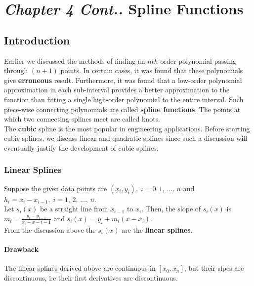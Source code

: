 \documentclass[aima203_lecturenotes_ku.tex]{subfiles}
\begin{document}
\chapter*{\textit{Chapter 4 Cont..} \hspace{15mm}  Spline Functions}
\section{Introduction}
Earlier we discussed the methods of finding an $nth$ order polynomial passing through $(n+1)$ points. In certain cases, it was found that these polynomials give \textbf{erroneous} result. Furthermore, it was found that a low-order polynomial approximation in each sub-interval provides a better approximation to the function than fitting a single high-order polynomial to the entire interval.
Such piece-wise connecting polynomials are called \textbf{spline functions}. The points at which two connecting splines meet are called knots.\\
The \textbf{cubic} spline is the most popular in engineering applications. Before starting cubic splines, we discuss linear and quadratic splines since such a discussion will eventually justify the development of cubic splines.

\subsection{Linear Splines}
Suppose the given data points are $(x_i,y_i), \; i=0,1,\, ..., \, n$ and  $h_i = x_i-x_{i-1} , \; i=1,\, 2, \, ..., \, n$. \\
Let $s_i(x)$ be a straight line from $x_{i-1}$ to $x_i$. Then, the slope of $s_i(x)$ is \\
$\displaystyle m_i = \frac{y_i - y_{i-1}}{x_i - x-{i-1}}$ and $s_i(x)= y_i + m_i(x-x_i)$. \\[2mm]
From the discussion above the $s_i(x)$ are the \textbf{linear splines}.

\subsubsection{Drawback}
The linear splines derived above are continuous in $[x_0, x_n]$, but their slpes are discontinuous, i.e their first derivatives are discontinuous.
\end{document}

